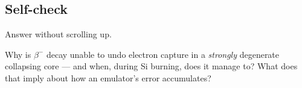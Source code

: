 \subsection{Self-check}
\label{sec:selfcheck-weak}

Answer without scrolling up.

\begin{selfcheck}
\item Why is $\beta^{-}$ decay unable to undo electron capture in a
  \emph{strongly} degenerate collapsing core --- and when, during Si burning,
  does it manage to? What does that imply about how an emulator's \Ye{} error
  accumulates?
\end{selfcheck}
